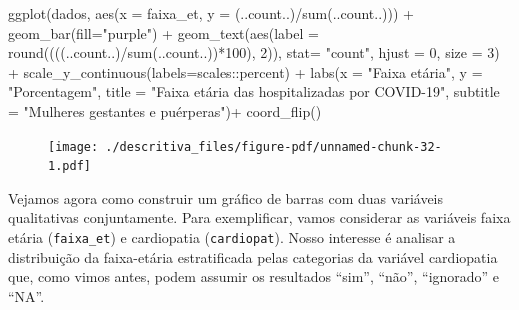 \documentclass[
  letterpaper,
  DIV=11,
  numbers=noendperiod]{scrreprt}
\newenvironment{Shaded}{\begin{snugshade}}{\end{snugshade}}
\newcommand{\AttributeTok}[1]{\textcolor[rgb]{0.40,0.45,0.13}{#1}}
\newcommand{\DecValTok}[1]{\textcolor[rgb]{0.68,0.00,0.00}{#1}}
\newcommand{\FunctionTok}[1]{\textcolor[rgb]{0.28,0.35,0.67}{#1}}
\newcommand{\NormalTok}[1]{\textcolor[rgb]{0.00,0.23,0.31}{#1}}
\newcommand{\SpecialCharTok}[1]{\textcolor[rgb]{0.37,0.37,0.37}{#1}}
\newcommand{\StringTok}[1]{\textcolor[rgb]{0.13,0.47,0.30}{#1}}
\begin{document}
\begin{Shaded}
\begin{Highlighting}[]
\FunctionTok{ggplot}\NormalTok{(dados, }\FunctionTok{aes}\NormalTok{(}\AttributeTok{x =}\NormalTok{ faixa\_et, }\AttributeTok{y =}\NormalTok{ (..count..)}\SpecialCharTok{/}\FunctionTok{sum}\NormalTok{(..count..))) }\SpecialCharTok{+}  
  \FunctionTok{geom\_bar}\NormalTok{(}\AttributeTok{fill=}\StringTok{"purple"}\NormalTok{) }\SpecialCharTok{+} 
  \FunctionTok{geom\_text}\NormalTok{(}\FunctionTok{aes}\NormalTok{(}\AttributeTok{label =} \FunctionTok{round}\NormalTok{((((..count..)}\SpecialCharTok{/}\FunctionTok{sum}\NormalTok{(..count..))}\SpecialCharTok{*}\DecValTok{100}\NormalTok{), }\DecValTok{2}\NormalTok{)), }\AttributeTok{stat=} \StringTok{"count"}\NormalTok{, }\AttributeTok{hjust =} \DecValTok{0}\NormalTok{, }\AttributeTok{size  =} \DecValTok{3}\NormalTok{) }\SpecialCharTok{+}
  \FunctionTok{scale\_y\_continuous}\NormalTok{(}\AttributeTok{labels=}\NormalTok{scales}\SpecialCharTok{::}\NormalTok{percent) }\SpecialCharTok{+}
  \FunctionTok{labs}\NormalTok{(}\AttributeTok{x =} \StringTok{"Faixa etária"}\NormalTok{, }\AttributeTok{y =} \StringTok{"Porcentagem"}\NormalTok{, }\AttributeTok{title =} \StringTok{"Faixa etária das hospitalizadas por COVID{-}19"}\NormalTok{, }\AttributeTok{subtitle =} \StringTok{"Mulheres gestantes e puérperas"}\NormalTok{)}\SpecialCharTok{+}
  \FunctionTok{coord\_flip}\NormalTok{()}
\end{Highlighting}
\end{Shaded}

\begin{figure}[H]

{\centering \texttt{[image: ./descritiva\_files/figure-pdf/unnamed-chunk-32-1.pdf]}

}

\end{figure}

Vejamos agora como construir um gráfico de barras com duas variáveis
qualitativas conjuntamente. Para exemplificar, vamos considerar as
variáveis faixa etária (\texttt{faixa\_et}) e cardiopatia
(\texttt{cardiopat}). Nosso interesse é analisar a distribuição da
faixa-etária estratificada pelas categorias da variável cardiopatia que,
como vimos antes, podem assumir os resultados ``sim'', ``não'',
``ignorado'' e ``NA''.
\end{document}
